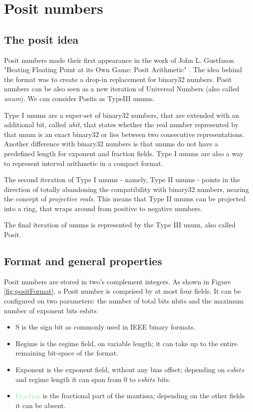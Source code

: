 \chapter{Posit numbers}



\section{The posit idea}

Posit numbers made their first appearance in the work of John L. Gustfason "Beating Floating Point at its Own Game: Posit Arithmetic" \cite{gustafson2017beating}. The idea behind the format was to create a drop-in replacement for binary32 numbers. Posit numbers can be also seen as a new iteration of Universal Numbers (also called \textit{unum}). We can consider Posits as TypeIII unums.


Type I unums are a super-set of binary32 numbers, that are extended with an additional bit, called \textit{ubit}, that states whether the real number represented by that unum is an exact binary32 or lies between two consecutive representations. Another difference with binary32 numbers is that unums do not have a predefined length for exponent and fraction fields. Type I unums are also a way to represent interval arithmetic in a compact format. 

The second iteration of Type I unums - namely, Type II unums - points in the direction of totally abandoning the compatibility with binary32 numbers, nearing the concept of \textit{projective reals}.
This means that Type II unums can be projected into a ring, that wraps around from positive to negative numbers.

The final iteration of unums is represented by the Type III unum, also called Posit.


\section{Format and general properties}

Posit numbers are stored in two's complement integers. As shown in Figure \ref{fig:positFormat}, a Posit number is comprised by at most four fields. It can be configured on two parameters: the number of total bits $\text{nbits}$ and the maximum number of exponent bits $\text{esbits}$
\begin{itemize}
    \item  \textcolor{asparago}{S} is the sign bit as commonly used in IEEE binary formats.
    \item \textcolor{amber}{Regime} is the regime field, on variable length; it can take up to the entire remaining bit-space of the format.
    \item \textcolor{lightred}{Exponent} is the exponent field, without any bias offset; depending on $esbits$ and regime length it can span from $0$ to $esbits$ bits.
    \item \textcolor{lightgreen}{Fraction} is the fractional part of the mantissa; depending on the other fields it can be absent.
\end{itemize}


